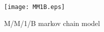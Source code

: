 
\begin{figure}[!h]
	\begin{center}
		\texttt{[image: MM1B.eps]}
		\caption{M/M/1/B markov chain model}
		\label{fig:MM1B}
		\vspace{-0.35in}
	\end{center}
	\vspace{15mm}
\end{figure}